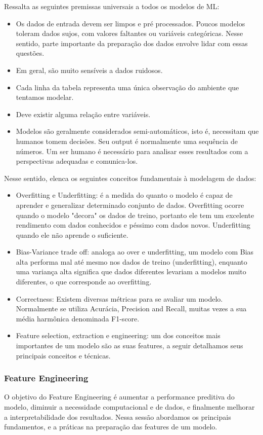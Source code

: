 \cite{PRINCIPLES} Ressalta as seguintes premissas universais a todos os modelos de ML:
\begin{itemize}
\item Os dados de entrada devem ser limpos e pré processados. Poucos modelos toleram dados sujos, com valores faltantes ou variáveis categóricas. Nesse sentido, parte importante da preparação dos dados envolve lidar com essas questões.
\item Em geral, são muito sensíveis a dados ruidosos. 
\item Cada linha da tabela representa uma única observação do ambiente que tentamos modelar. 
\item  Deve existir alguma relação entre variáveis.
\item Modelos são geralmente considerados semi-automáticos, isto é, necessitam que humanos tomem decisões. Seu output é normalmente uma sequência de números. Um ser humano é necessário para analisar esses resultados com a perspectivas adequadas e comunica-los.
\end{itemize}

Nesse sentido, \cite{SCRATCH} elenca os seguintes conceitos fundamentais à modelagem de dados:
\begin{itemize}
\item Overfitting e Underfitting: é a medida do quanto o modelo é capaz de aprender e generalizar determinado conjunto de dados. Overfitting ocorre quando o modelo "decora" os dados de treino, portanto ele tem um excelente rendimento com dados conhecidos e péssimo com dados novos. Underfitting quando ele não aprende o suficiente.
\item Bias-Variance trade off: analoga ao over e underfitting, um modelo com Bias alta performa mal até mesmo nos dados de treino (underfitting), enquanto uma variança alta significa que dados diferentes levariam a modelos muito diferentes, o que corresponde ao overfitting.
\item Correctness: Existem diversas métricas para se avaliar um modelo. Normalmente se utiliza Acurácia,  Precision and Recall, muitas vezes a sua média harmônica denominada F1-score. 
\item Feature selection, extraction e engineering: um dos conceitos mais importantes de um modelo são as suas features, a seguir detalhamos seus principais conceitos e técnicas.
\end{itemize}

\subsubsection{Feature Engineering} \label{feature-Eng}
O objetivo do Feature Engineering é aumentar a performance preditiva do modelo, diminuir a necessidade computacional e de dados, e finalmente melhorar a interpretabilidade dos resultados. Nessa sessão abordamos os principais fundamentos, e a práticas na preparação das features de um modelo. 

